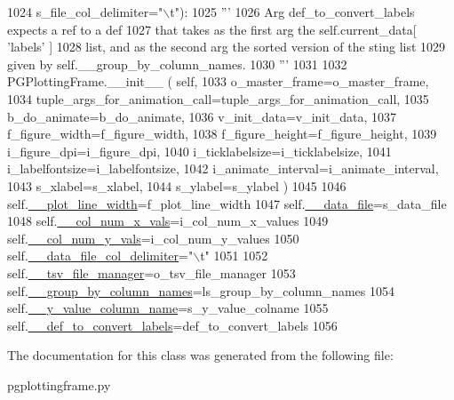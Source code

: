 \begin{DoxyCode}
1024                     s\_file\_col\_delimiter=\textcolor{stringliteral}{"\(\backslash\)t"}):
1025         \textcolor{stringliteral}{'''}
1026 \textcolor{stringliteral}{        Arg def\_to\_convert\_labels expects a ref to a def}
1027 \textcolor{stringliteral}{        that takes as the first arg the self.current\_data[ 'labels' ]}
1028 \textcolor{stringliteral}{        list, and as the second arg the sorted version of the sting list }
1029 \textcolor{stringliteral}{        given by self.\_\_group\_by\_column\_names.}
1030 \textcolor{stringliteral}{        '''}
1031 
1032         PGPlottingFrame.\_\_init\_\_ ( self, 
1033                             o\_master\_frame=o\_master\_frame,
1034                             tuple\_args\_for\_animation\_call=tuple\_args\_for\_animation\_call,
1035                             b\_do\_animate=b\_do\_animate,
1036                             v\_init\_data=v\_init\_data,
1037                             f\_figure\_width=f\_figure\_width,
1038                             f\_figure\_height=f\_figure\_height,
1039                             i\_figure\_dpi=i\_figure\_dpi,
1040                             i\_ticklabelsize=i\_ticklabelsize,
1041                             i\_labelfontsize=i\_labelfontsize,
1042                             i\_animate\_interval=i\_animate\_interval,
1043                             s\_xlabel=s\_xlabel,
1044                             s\_ylabel=s\_ylabel )
1045         
1046         self.\hyperlink{classnegui_1_1pgplottingframe_1_1PGPlottingFrameBoxplotFromFileManager_a38b85f4b9edcbe85d462a0b5bf25b3ab}{\_\_plot\_line\_width}=f\_plot\_line\_width
1047         self.\hyperlink{classnegui_1_1pgplottingframe_1_1PGPlottingFrameBoxplotFromFileManager_a43ec81460801e687bd7acc0a572b91ce}{\_\_data\_file}=s\_data\_file
1048         self.\hyperlink{classnegui_1_1pgplottingframe_1_1PGPlottingFrameBoxplotFromFileManager_ab5f82aca153c7083144db53e615fc180}{\_\_col\_num\_x\_vals}=i\_col\_num\_x\_values
1049         self.\hyperlink{classnegui_1_1pgplottingframe_1_1PGPlottingFrameBoxplotFromFileManager_a737a287125c74f3727a68dc16b03770e}{\_\_col\_num\_y\_vals}=i\_col\_num\_y\_values
1050         self.\hyperlink{classnegui_1_1pgplottingframe_1_1PGPlottingFrameBoxplotFromFileManager_ae65dfb0c44264c2735aa6e95efcfebf8}{\_\_data\_file\_col\_delimiter}=\textcolor{stringliteral}{"\(\backslash\)t"}
1051 
1052         self.\hyperlink{classnegui_1_1pgplottingframe_1_1PGPlottingFrameBoxplotFromFileManager_aaf674408cc4a86decba4ebf827544adf}{\_\_tsv\_file\_manager}=o\_tsv\_file\_manager
1053         self.\hyperlink{classnegui_1_1pgplottingframe_1_1PGPlottingFrameBoxplotFromFileManager_a96dd728a8c4e38231b3b30a95c4340ff}{\_\_group\_by\_column\_names}=ls\_group\_by\_column\_names
1054         self.\hyperlink{classnegui_1_1pgplottingframe_1_1PGPlottingFrameBoxplotFromFileManager_a838ca214081389043ad1c5b872ed8136}{\_\_y\_value\_column\_name}=s\_y\_value\_colname
1055         self.\hyperlink{classnegui_1_1pgplottingframe_1_1PGPlottingFrameBoxplotFromFileManager_abde165a1f2ed58517a8cb7082577fbdf}{\_\_def\_to\_convert\_labels}=def\_to\_convert\_labels
1056 
\end{DoxyCode}


The documentation for this class was generated from the following file\+:\begin{DoxyCompactItemize}
\item 
pgplottingframe.\+py\end{DoxyCompactItemize}

